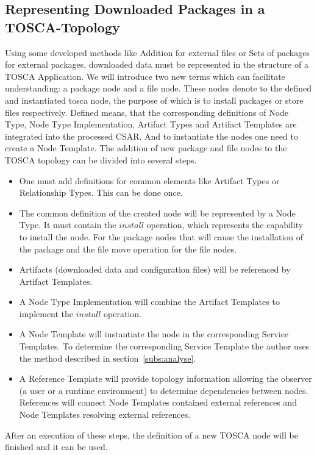 \subsection{Representing Downloaded Packages in a TOSCA-Topology} \label{subs:repres}
Using some developed methods like Addition for external files or Sets of packages for external packages, downloaded data must be represented in the structure of a TOSCA Application.
We will introduce two new terms which can facilitate understanding: a package node and a file node.
These nodes denote to the defined and instantiated \gls{tosca} node, the purpose of which is to install packages or store files respectively.
Defined means, that the corresponding definitions of Node Type, Node Type Implementation, Artifact Types and Artifact Templates are integrated into the processed CSAR.
And to instantiate the nodes one need to create a Node Template.
The addition of new package and file nodes to the TOSCA topology can be divided into several steps.
\begin{itemize}
	\item One must add definitions for common elements like Artifact Types or Relationship Types. 
		This can be done once.
	\item The common definition of the created node will be represented by a Node Type.   
		It must contain the $install$ operation, which represents the capability to install the node.
		For the package nodes that will cause the installation of the package and the file move operation for the file nodes.
	\item Artifacts (downloaded data and configuration files) will be referenced by Artifact Templates.
	\item A Node Type Implementation will combine the Artifact Templates to implement the $install$ operation.
	\item A Node Template will instantiate the node in the corresponding Service Templates.
		To determine the corresponding Service Template the author  uses the method described in section~\ref{subs:analyse}.
	\item A Reference Template will provide topology information allowing the observer (a user or a runtime environment) to determine dependencies between nodes.
		References will connect Node Templates contained external references and Node Templates resolving external references.
\end{itemize}
After an execution of these steps, the definition of a new TOSCA node will be finished and it can be used.

